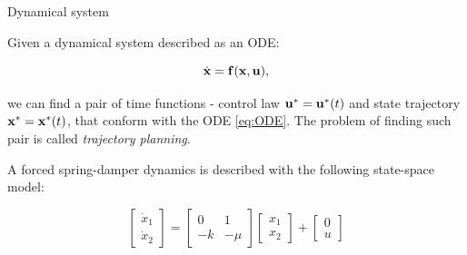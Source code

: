 \documentclass{beamer}
\begin{document}
\begin{frame}{Dynamical system}
	\begin{flushleft}
		
		Given a dynamical system described as an ODE:
		
		\begin{equation}
			\label{eq:ODE}
			\dot{\mathbf{x}} = \mathbf{f}(\mathbf{x}, \mathbf{u}),
		\end{equation} 
		
		we can find a pair of time functions - control law $\mathbf{u}^* = \mathbf{u}^*(t)$ and state trajectory $\mathbf{x}^* = \mathbf{x}^*(t)$, that conform with the ODE \eqref{eq:ODE}. The problem of finding such pair is called \emph{trajectory planning}.
		
		\bigskip
		
		\begin{example}
			
			A forced spring-damper dynamics is described with the following state-space model:
			
			$$
			\begin{bmatrix}
				\dot x_1 \\ \dot x_2
			\end{bmatrix}
			= 
			\begin{bmatrix}
				0 & 1 \\ -k & -\mu
			\end{bmatrix}
			\begin{bmatrix}
				x_1 \\ x_2
			\end{bmatrix}
		+
		\begin{bmatrix}
			0 \\ u
		\end{bmatrix}
			$$
		\end{example}
		
	\end{flushleft}
\end{frame}
\end{document}
